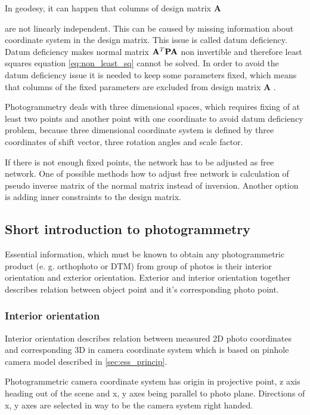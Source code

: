 \documentclass[a4paper,12pt]{article}
\newcommand{\ematr}[1]{
{\bf #1}
}
\begin{document}
In geodesy, it can happen that columns of design matrix \ematr{A}
are not linearly independent. This can be caused by missing information
about coordinate system in the design matrix. This issue is called datum deficiency.
Datum deficiency makes normal matrix $ \ematr{A}^{T} \ematr{P} \ematr{A}$ non invertible and therefore 
least squares equation \ref{eq:non_least_sq} cannot be solved.
In order to avoid the datum deficiency issue it is needed to keep some parameters fixed, 
which means that columns of the fixed parameters are excluded from design matrix\ematr{A}.

Photogrammetry deals with three dimensional spaces, which requires fixing of at least  
two points and another point with one coordinate to avoid datum deficiency problem, because
three dimensional coordinate system is defined by three coordinates of shift vector, three rotation angles and scale factor. 

If there is not enough fixed points, the network has to be adjusted as free network.
One of possible methods how to adjust free network is calculation of pseudo inverse matrix of the normal matrix instead of
inversion. Another option is adding inner constraints to the design matrix.

\subsection{Short introduction to photogrammetry}

Essential information, which must be known to obtain any photogrammetric
 product (e. g. orthophoto or DTM) from group of photos is their interior orientation and exterior orientation.
Exterior and interior orientation together describes relation between object point and
it's corresponding photo point.

\subsubsection{Interior orientation}

Interior orientation describes relation between measured 2D photo coordinates 
and corresponding 3D in camera coordinate system which is based on pinhole camera model described in \ref{sec:ess_princip}.

Photogrammetric camera coordinate system has origin in projective point,
z axis heading out of the scene  and x, y axes being parallel to photo plane. Directions of 
x, y axes are selected in way to be the camera system right handed.
\end{document}
